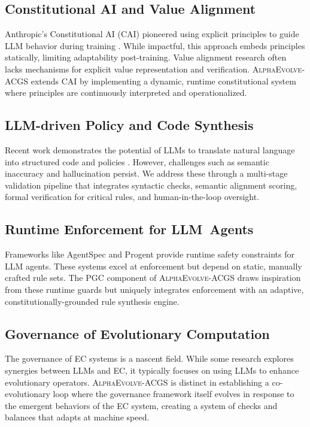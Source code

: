 \documentclass[10pt,twocolumn]{article}
\newcommand{\acgs}{\textsc{AlphaEvolve-ACGS}}
\theoremstyle{definition}
\begin{document}
\subsection{Constitutional AI and Value Alignment}
Anthropic's Constitutional AI (CAI) pioneered using explicit principles to guide LLM behavior during training \cite{anthropic2022constitutional}. While impactful, this approach embeds principles statically, limiting adaptability post-training. Value alignment research \cite{russell2019human} often lacks mechanisms for explicit value representation and verification. \acgs{} extends CAI by implementing a dynamic, runtime constitutional system where principles are continuously interpreted and operationalized.

\subsection{LLM-driven Policy and Code Synthesis}
Recent work demonstrates the potential of LLMs to translate natural language into structured code and policies \cite{propertygpt2023, veriplan2023}. However, challenges such as semantic inaccuracy and hallucination persist. We address these through a multi-stage validation pipeline that integrates syntactic checks, semantic alignment scoring, formal verification for critical rules, and human-in-the-loop oversight.

\subsection{Runtime Enforcement for LLM~Agents}
Frameworks like AgentSpec \cite{agentspec2023} and Progent \cite{progent2023} provide runtime safety constraints for LLM agents. These systems excel at enforcement but depend on static, manually crafted rule sets. The PGC component of \acgs{} draws inspiration from these runtime guards but uniquely integrates enforcement with an adaptive, constitutionally-grounded rule synthesis engine.

\subsection{Governance of Evolutionary Computation}
The governance of EC systems is a nascent field. While some research explores synergies between LLMs and EC, it typically focuses on using LLMs to enhance evolutionary operators. \acgs{} is distinct in establishing a co-evolutionary loop where the governance framework itself evolves in response to the emergent behaviors of the EC system, creating a system of checks and balances that adapts at machine speed.
\end{document}
